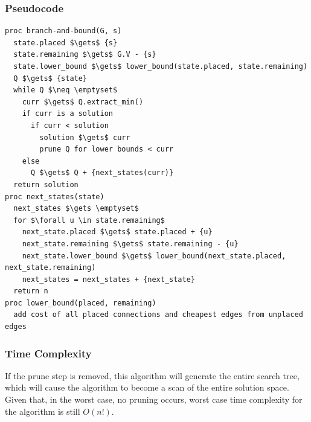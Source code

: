 \documentclass[a4paper,12pt]{article}
\begin{document}
\subsubsection{Pseudocode}
\begin{lstlisting}[mathescape=true]
proc branch-and-bound(G, s)
  state.placed $\gets$ {s}
  state.remaining $\gets$ G.V - {s}
  state.lower_bound $\gets$ lower_bound(state.placed, state.remaining)
  Q $\gets$ {state}
  while Q $\neq \emptyset$
    curr $\gets$ Q.extract_min()
    if curr is a solution
      if curr < solution
        solution $\gets$ curr
        prune Q for lower bounds < curr
    else
      Q $\gets$ Q + {next_states(curr)}
  return solution
proc next_states(state)
  next_states $\gets \emptyset$
  for $\forall u \in state.remaining$
    next_state.placed $\gets$ state.placed + {u}
    next_state.remaining $\gets$ state.remaining - {u}
    next_state.lower_bound $\gets$ lower_bound(next_state.placed, next_state.remaining)
    next_states = next_states + {next_state}
  return n
proc lower_bound(placed, remaining)
  add cost of all placed connections and cheapest edges from unplaced edges
\end{lstlisting}
\subsubsection{Time Complexity}
If the prune step is removed, this algorithm will generate the entire search tree, which will cause the algorithm to become a scan of the entire solution space. Given that, in the worst case, no pruning occurs, worst case time complexity for the algorithm is still $O(n!)$.
\end{document}
